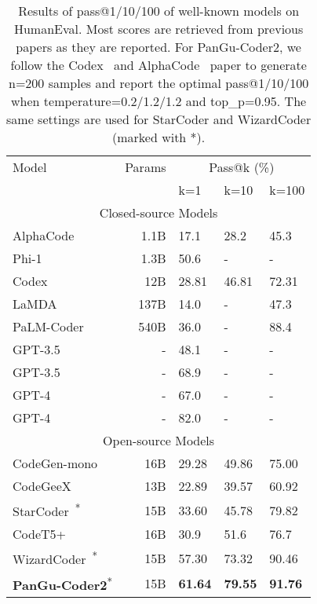 \documentclass{article}
\newcommand{\pgcoder}{PanGu-Coder2\xspace}
\begin{document}
\begin{table}
	\caption{Results of pass@1/10/100 of well-known models on HumanEval. Most scores are retrieved from previous papers as they are reported. For \pgcoder, we follow the Codex~\cite{codex} and AlphaCode~\cite{alphacode} paper to generate n=200 samples and report the optimal pass@1/10/100 when temperature=0.2/1.2/1.2 and top\_p=0.95. The same settings are used for StarCoder and WizardCoder (marked with *).}
	\centering
	\begin{tabular}{lrlll}
		\toprule
		\multirow{2.5}{*}{Model}  & \multirow{2.5}{*}{Params} & \multicolumn{3}{c}{Pass@k (\%)} \\ 
            \cmidrule(r){3-5} 
            & & k=1 & k=10 & k=100 \\
            \midrule
            \multicolumn{5}{c}{Closed-source Models} \\
		\midrule
            AlphaCode~\cite{alphacode}  & 1.1B & 17.1 & 28.2 & 45.3 \\
            Phi-1~\cite{phi-1} & 1.3B & 50.6 & - & - \\
            Codex~\cite{codex} & 12B & 28.81 & 46.81 & 72.31 \\
            LaMDA~\cite{lamda} & 137B & 14.0 & - & 47.3 \\
            PaLM-Coder~\cite{palm} & 540B & 36.0 & - & 88.4 \\
            GPT-3.5~\cite{gpt4-report} & - & 48.1 & - & - \\
            GPT-3.5~\cite{wizardcoder} & - & 68.9 & - & - \\
            GPT-4~\cite{gpt4-report} & - &  67.0 & - & - \\
            GPT-4~\cite{sparks} & - &  82.0 & - & - \\
            \midrule
            \multicolumn{5}{c}{Open-source Models} \\
            \midrule
            CodeGen-mono~\cite{codegen} & 16B & 29.28 & 49.86 & 75.00 \\
            CodeGeeX~\cite{codegeex} & 13B & 22.89 & 39.57 & 60.92 \\
            StarCoder~\cite{starcoder}\textsuperscript{*}   & 15B & 33.60 & 45.78 &  79.82  \\
            CodeT5+~\cite{codet5plus} & 16B & 30.9& 51.6& 76.7\\
            WizardCoder~\cite{wizardcoder}\textsuperscript{*}  & 15B  & 57.30 & 73.32 & 90.46  \\
            \midrule
            \textbf{\pgcoder}\textsuperscript{*} & 15B & \textbf{61.64} & \textbf{79.55} & \textbf{91.76}\\
		\bottomrule
	\end{tabular}
	\label{tab.pass1-10-100}
\end{table}
\end{document}
